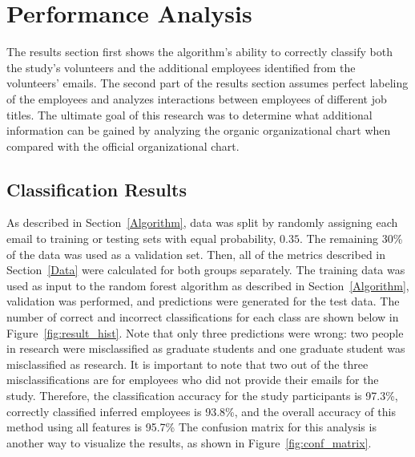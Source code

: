 \documentclass[12pt]{report}
\begin{document}
\chapter{Performance Analysis} \label{Performance}
The results section first shows the algorithm's ability to correctly classify both the study's volunteers and the additional employees identified from the volunteers' emails.
The second part of the results section assumes perfect labeling of the employees and analyzes interactions between employees of different job titles.
The ultimate goal of this research was to determine what additional information can be gained by analyzing the organic organizational chart when compared with the official organizational chart.

\section{Classification Results}
As described in Section~\ref{Algorithm}, data was split by randomly assigning each email to training or testing sets with equal probability, $0.35$.
The remaining 30\% of the data was used as a validation set.
Then, all of the metrics described in Section~\ref{Data} were calculated for both groups separately.
The training data was used as input to the random forest algorithm as described in Section~\ref{Algorithm}, validation was performed, and predictions were generated for the test data.
The number of correct and incorrect classifications for each class are shown below in Figure~\ref{fig:result_hist}.
Note that only three predictions were wrong: two people in research were misclassified as graduate students and one graduate student was misclassified as research.
It is important to note that two out of the three misclassifications are for employees who did not provide their emails for the study.
Therefore, the classification accuracy for the study participants is 97.3\%, correctly classified inferred employees is 93.8\%, and the overall accuracy of this method using all features is 95.7\%
The confusion matrix for this analysis is another way to visualize the results, as shown in Figure~\ref{fig:conf_matrix}.
\end{document}
